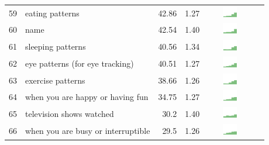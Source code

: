 \begin{table}[t]
\begin{center}
\begin{tabular}{| r | l | r | r | r | r |}
59 & eating patterns & 42.86 & 1.27 & \includegraphics[width = 2cm, height = 0.5cm]{tex-inputs/table-images/learnedwhenhowmuchandwhatyouareeatingcombined} \\ 
60 & name & 42.54 & 1.40 & \includegraphics[width = 2cm, height = 0.5cm]{tex-inputs/table-images/learnedyournamecombined} \\ 
61 & sleeping patterns & 40.56 & 1.34 & \includegraphics[width = 2cm, height = 0.5cm]{tex-inputs/table-images/learnedwhenandhowwellyouaresleepingcombined} \\ 
62 & eye patterns (for eye tracking) & 40.51 & 1.27 & \includegraphics[width = 2cm, height = 0.5cm]{tex-inputs/table-images/scannedyoureyetolearnyoureyepatterns(foreyetracking)combined} \\ 
63 & exercise patterns & 38.66 & 1.26 & \includegraphics[width = 2cm, height = 0.5cm]{tex-inputs/table-images/learnedwhenhowandhowmuchyouexercisecombined} \\ 
64 & when you are happy or having fun & 34.75 & 1.27 & \includegraphics[width = 2cm, height = 0.5cm]{tex-inputs/table-images/learnedwhenyouwerehappyorhavingfuncombined} \\ 
65 & television shows watched & 30.2 & 1.40 & \includegraphics[width = 2cm, height = 0.5cm]{tex-inputs/table-images/learnedwhattelevisionshowsyouwatchcombined} \\ 
66 & when you are busy or interruptible & 29.5 & 1.26 & \includegraphics[width = 2cm, height = 0.5cm]{tex-inputs/table-images/learnedwhenyouarebusyorinterruptiblecombined} \\ 

\end{tabular}
\end{center}
\end{table}
